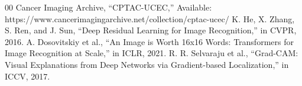 \documentclass[conference]{IEEEtran}
\begin{document}
\begin{thebibliography}{00}
 Cancer Imaging Archive, ``CPTAC-UCEC,'' Available: https://www.cancerimagingarchive.net/collection/cptac-ucec/
 K. He, X. Zhang, S. Ren, and J. Sun, ``Deep Residual Learning for Image Recognition,'' in CVPR, 2016.
 A. Dosovitskiy et al., ``An Image is Worth 16x16 Words: Transformers for Image Recognition at Scale,'' in ICLR, 2021.
 R. R. Selvaraju et al., ``Grad-CAM: Visual Explanations from Deep Networks via Gradient-based Localization,'' in ICCV, 2017.
\end{thebibliography}
\end{document}
